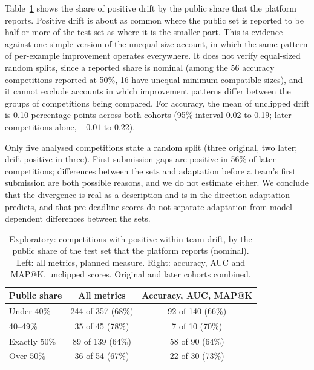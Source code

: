 \documentclass[10pt]{article}
\begin{document}
Table~\ref{tab:share} shows the share of positive drift by the public share that the platform reports. Positive drift is about as common where the public set is reported to be half or more of the test set as where it is the smaller part. This is evidence against one simple version of the unequal-size account, in which the same pattern of per-example improvement operates everywhere. It does not verify equal-sized random splits, since a reported share is nominal (among the 56 accuracy competitions reported at 50\%, 16 have unequal minimum compatible sizes), and it cannot exclude accounts in which improvement patterns differ between the groups of competitions being compared. For accuracy, the mean of unclipped drift is 0.10 percentage points across both cohorts (95\% interval 0.02 to 0.19; later competitions alone, $-0.01$ to 0.22).

Only five analysed competitions state a random split (three original, two later; drift positive in three). First-submission gaps are positive in 56\% of later competitions; differences between the sets and adaptation before a team's first submission are both possible reasons, and we do not estimate either. We conclude that the divergence is real as a description and is in the direction adaptation predicts, and that pre-deadline scores do not separate adaptation from model-dependent differences between the sets.

\begin{table}[t]
\caption{Exploratory: competitions with positive within-team drift, by the public share of the test set that the platform reports (nominal). Left: all metrics, planned measure. Right: accuracy, AUC and MAP@K, unclipped scores. Original and later cohorts combined.}
\label{tab:share}
\centering\small
\begin{tabular}{lcc}
\toprule
Public share & All metrics & Accuracy, AUC, MAP@K \\
\midrule
Under 40\% & 244 of 357 (68\%) & 92 of 140 (66\%) \\
40--49\% & 35 of 45 (78\%) & 7 of 10 (70\%) \\
Exactly 50\% & 89 of 139 (64\%) & 58 of 90 (64\%) \\
Over 50\% & 36 of 54 (67\%) & 22 of 30 (73\%) \\
\bottomrule
\end{tabular}
\end{table}
\end{document}
